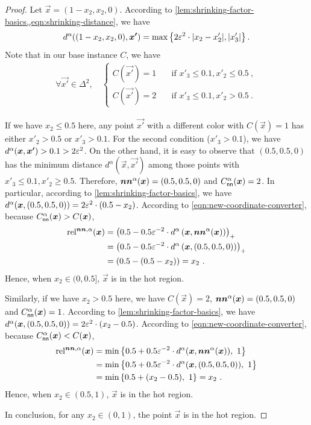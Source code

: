 \begin{proof}
    Let $\vec{x}=(1-x_2,x_2,0)$.
    According to \cref{lem:shrinking-factor-basics,,eqn:shrinking-distance}, we have 
    \begin{align*}
        d^{\alpha}((1-x_2,x_2,0), \vec{x'}) = \max\set{2\eps^2 \cdot |x_2-x'_2|, |x'_3|}. 
    \end{align*}
    Note that in our base instance $C$, we have 
    \begin{align*}
        \forall \vec{x'}\in \Delta^2, \quad
        \begin{cases}
        C(\vec{x'}) = 1 & \quad \text{if } x'_3\leq 0.1, x'_2 \leq 0.5~,\\
        C(\vec{x'}) = 2 & \quad \text{if } x'_3\leq 0.1, x'_2 > 0.5~.
        \end{cases}
    \end{align*}
    
    If we have $x_2\leq 0.5$ here, any point $\vec{x'}$ with a different color with $C(\vec{x})=1$ has either $x'_2>0.5$ or $x'_3>0.1$. 
    For the second condition ($x'_3>0.1$), we have $d^{\alpha}(\vec{x}, \vec{x'})>0.1>2\eps^2$.
    On the other hand, it is easy to observe that $(0.5, 0.5, 0)$ has the minimum distance $d^{\alpha}(\vec{x},\vec{x'})$ among those points with $x'_3\leq 0.1, x'_2\geq 0.5$. 
    Therefore, $\nna(\vec{x})=(0.5,0.5,0)$ and $C^{\alpha}_{\sf nn}(\vec{x})=2$.
    In particular, according to \cref{lem:shrinking-factor-basics}, we have $d^{\alpha}(\vec{x}, (0.5, 0.5, 0))=2\eps^2 \cdot(0.5-x_2)$. 
    According to \cref{eqn:new-coordinate-converter}, because $C^{\alpha}_{\sf nn}(\vec{x})>C(\vec{x})$,
    \begin{align*}
        \rela(\vec{x}) &= \left(0.5-0.5\eps^{-2} \cdot d^{\alpha}\left(\vec{x}, \nna(\vec{x})\right)\right)_+
        \\
        &= \left(0.5-0.5\eps^{-2} \cdot d^{\alpha}\left(\vec{x}, (0.5,0.5,0)\right)\right)_+
        \\
        &= \left(0.5-(0.5-x_2)\right) = x_2~.
    \end{align*}
    Hence, when $x_2\in (0,0.5]$, $\vec{x}$ is in the hot region.

    Similarly, if we have $x_2> 0.5$ here, we have $C(\vec{x})=2$, $\nna(\vec{x})=(0.5,0.5,0)$ and $C_{\sf nn}^{\alpha}(\vec{x})=1$. 
    According to \cref{lem:shrinking-factor-basics}, we have $d^{\alpha}(\vec{x}, (0.5, 0.5, 0))=2\eps^2 \cdot(x_2-0.5)$. 
    According to \cref{eqn:new-coordinate-converter}, because $C_{\sf nn}^\alpha(\vec{x})<C(\vec{x})$,
    \begin{align*}
        \rela(\vec{x}) &= \min\set{0.5+0.5\eps^{-2}\cdot d^{\alpha}(\vec{x}, \nna(\vec{x})),\ 1}
        \\
        &= \min\set{0.5+0.5\eps^{-2}\cdot d^{\alpha}(\vec{x}, (0.5,0.5,0)),\ 1}
        \\
        &= \min\set{0.5+(x_2-0.5),\ 1} = x_2~.
    \end{align*}
    Hence, when $x_2\in (0.5,1)$, $\vec{x}$ is in the hot region.
    
    In conclusion, for any $x_2\in (0,1)$, the point $\vec{x}$ is in the hot region.
\end{proof}

